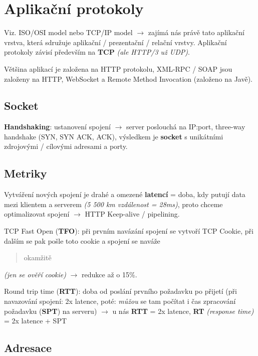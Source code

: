 \section{Aplikační protokoly}

Viz. ISO/OSI model nebo TCP/IP model $\to$ zajímá nás právě tato aplikační vrstva, která sdružuje aplikační / prezentační / relační vrstvy. Aplikační protokoly závisí především na \textbf{TCP} \textit{(ale HTTP/3 už UDP)}.

\vspace{4pt}
\noindent Většina aplikací je založena na HTTP protokolu, XML-RPC / SOAP jsou založeny na HTTP, WebSocket a Remote Method Invocation (založeno na Javě).

\subsection{Socket}

\textbf{Handshaking}: ustanovení spojení $\to$ server poslouchá na IP:port, three-way handshake (SYN, SYN ACK, ACK), výsledkem je \textbf{socket} s unikátními zdrojovými / cílovými adresami a porty.

\subsection{Metriky}

Vytváření nových spojení je drahé a omezené \textbf{latencí} = doba, kdy putují data mezi klientem a serverem \textit{(5 500 km vzdálenost = 28ms)}, proto chceme optimalizovat spojení $\to$ HTTP Keep-alive / pipelining.

\vspace{4pt}
\noindent TCP Fast Open (\textbf{TFO}): při prvním navázání spojení se vytvoří TCP Cookie, při dalším se pak pošle toto cookie a spojení se naváže \blockquote{okamžitě} \textit{(jen se ověří cookie)} $\to$ redukce až o 15\%.

\vspace{4pt}
\noindent Round trip time (\textbf{RTT}): doba od poslání prvního požadavku po přijetí (při navazování spojení: 2x latence, poté: \textit{můžou} se tam počítat i čas zpracování požadavku (\textbf{SPT}) na serveru) $\to$ u nás \textbf{RTT} = 2x latence, \textbf{RT} \textit{(response time)} = 2x latence + SPT

\subsection{Adresace}

